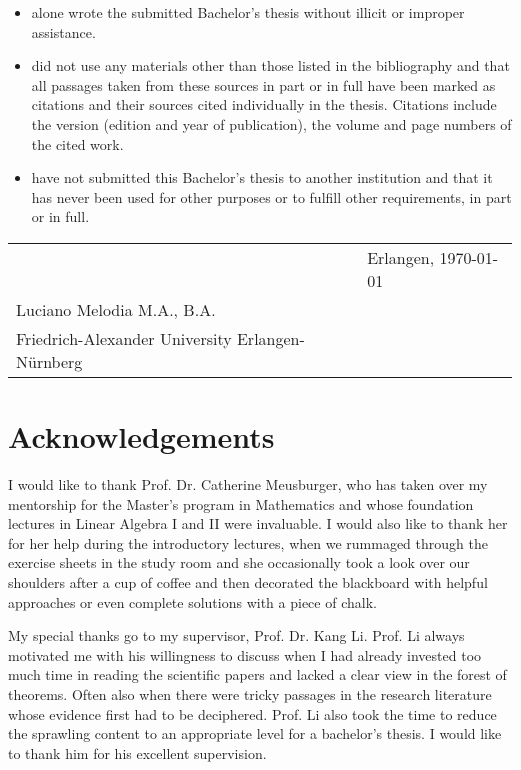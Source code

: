 \documentclass[b5paper, 11pt, twoside]{report}
\begin{document}
\begin{itemize}
	\item alone wrote the submitted Bachelor's thesis without illicit or improper assistance.
	\item did not use any materials other than those listed in the bibliography and that all passages taken from these sources in part or in full have been marked as citations and their sources cited individually in the thesis. Citations include the version (edition and year of publication), the volume and page numbers of the cited work.
	\item have not submitted this Bachelor's thesis to another institution and that it has never been used for other purposes or to fulfill other requirements, in part or in full.
\end{itemize}

\vspace{2cm}
\begin{tabular}{@{}p{3.5in}p{2in}p{2in}@{}}
\hrulefill && Erlangen, \today\\
Luciano Melodia M.A., B.A. &&\\
Friedrich-Alexander University Erlangen-Nürnberg\end{tabular}

\chapter*{Acknowledgements}

I would like to thank Prof. Dr. Catherine Meusburger, who has taken over my mentorship for the Master's program in Mathematics and whose foundation lectures in Linear Algebra I and II were invaluable. I would also like to thank her for her help during the introductory lectures, when we rummaged through the exercise sheets in the study room and she occasionally took a look over our shoulders after a cup of coffee and then decorated the blackboard with helpful approaches or even complete solutions with a piece of chalk.

My special thanks go to my supervisor, Prof. Dr. Kang Li. Prof. Li always motivated me with his willingness to discuss when I had already invested too much time in reading the scientific papers and lacked a clear view in the forest of theorems. Often also when there were tricky passages in the research literature whose evidence first had to be deciphered. Prof. Li also took the time to reduce the sprawling content to an appropriate level for a bachelor's thesis. I would like to thank him for his excellent supervision.
\end{document}
